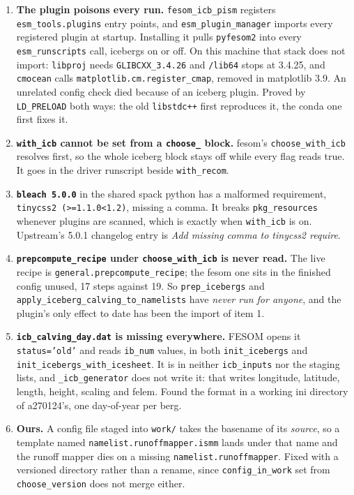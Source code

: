 \documentclass[11pt,a4paper]{article}
\newcommand{\code}[1]{\texttt{\small #1}}
\begin{document}
\begin{enumerate}
\item \textbf{The plugin poisons every run.} \code{fesom\_icb\_pism} registers
      \code{esm\_tools.plugins} entry points, and \code{esm\_plugin\_manager} imports every
      registered plugin at startup. Installing it pulls \code{pyfesom2} into every
      \code{esm\_runscripts} call, icebergs on or off. On this machine that stack does not import:
      \code{libproj} needs \code{GLIBCXX\_3.4.26} and \code{/lib64} stops at 3.4.25, and
      \code{cmocean} calls \code{matplotlib.cm.register\_cmap}, removed in matplotlib 3.9. An
      unrelated config check died because of an iceberg plugin. Proved by \code{LD\_PRELOAD} both
      ways: the old \code{libstdc++} first reproduces it, the conda one first fixes it.
\item \textbf{\code{with\_icb} cannot be set from a \code{choose\_} block.} fesom's
      \code{choose\_with\_icb} resolves first, so the whole iceberg block stays off while every
      flag reads true. It goes in the driver runscript beside \code{with\_recom}.
\item \textbf{\code{bleach 5.0.0}} in the shared spack python has a malformed requirement,
      \code{tinycss2 (>=1.1.0<1.2)}, missing a comma. It breaks \code{pkg\_resources} whenever
      plugins are scanned, which is exactly when \code{with\_icb} is on. Upstream's 5.0.1
      changelog entry is \emph{Add missing comma to tinycss2 require}.
\item \textbf{\code{prepcompute\_recipe} under \code{choose\_with\_icb} is never read.} The live
      recipe is \code{general.prepcompute\_recipe}; the fesom one sits in the finished config
      unused, 17 steps against 19. So \code{prep\_icebergs} and
      \code{apply\_iceberg\_calving\_to\_namelists} have \emph{never run for anyone}, and the
      plugin's only effect to date has been the import of item 1.
\item \textbf{\code{icb\_calving\_day.dat} is missing everywhere.} FESOM opens it
      \code{status='old'} and reads \code{ib\_num} values, in both \code{init\_icebergs} and
      \code{init\_icebergs\_with\_icesheet}. It is in neither \code{icb\_inputs} nor the staging
      lists, and \code{\_icb\_generator} does not write it: that writes longitude, latitude,
      length, height, scaling and felem. Found the format in a working ini directory of
      a270124's, one day-of-year per berg.
\item \textbf{Ours.} A config file staged into \code{work/} takes the basename of its
      \emph{source}, so a template named \code{namelist.runoffmapper.ismm} lands under that name
      and the runoff mapper dies on a missing \code{namelist.runoffmapper}. Fixed with a versioned
      directory rather than a rename, since \code{config\_in\_work} set from
      \code{choose\_version} does not merge either.
\end{enumerate}
\end{document}
